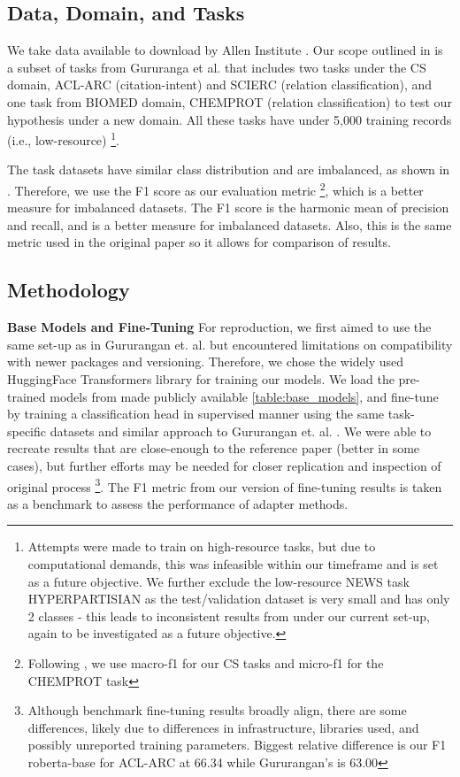 \documentclass[10pt,twocolumn,letterpaper]{article}
\begin{document}
\subsection{Data, Domain, and Tasks} 
We take data available to download by Allen Institute \cite{allenai_dont_stop_pretraining}. Our scope outlined in  is a subset of tasks from Gururanga et al. \cite{gururangan2020dont} that includes two tasks under the CS domain, ACL-ARC (citation-intent) and SCIERC (relation classification), and one task from BIOMED domain, CHEMPROT (relation classification) to test our hypothesis under a new domain. All these tasks have under 5,000 training records (i.e., low-resource) \footnote{Attempts were made to train on high-resource tasks, but due to computational demands, this was infeasible within our timeframe and is set as a future objective. We further exclude the low-resource NEWS task HYPERPARTISIAN as the test/validation dataset is very small and has only 2 classes - this leads to inconsistent results from \cite{allenai_dont_stop_pretraining} under our current set-up, again to be investigated as a future objective.}.

The task datasets have similar class distribution and are imbalanced, as shown in . Therefore, we use the F1 score as our evaluation metric \footnote{Following \cite{gururangan2020dont}, we use macro-f1 for our CS tasks and micro-f1 for the CHEMPROT task}, which is a better measure for imbalanced datasets. The F1 score is the harmonic mean of precision and recall, and is a better measure for imbalanced datasets. Also, this is the same metric used in the original paper \cite{gururangan2020dont} so it allows for comparison of results.

\subsection{Methodology} 

\textbf{Base Models and Fine-Tuning} For reproduction, we first aimed to use the same set-up as in Gururangan et. al. \cite{allenai_dont_stop_pretraining} but encountered limitations on compatibility with newer packages and versioning. Therefore, we chose the widely used HuggingFace Transformers library \cite{transformers} for training our models. We load the pre-trained models from \cite{allenai_dont_stop_pretraining} made publicly available \ref{table:base_models}, and fine-tune by training a classification head in supervised manner using the same task-specific datasets and similar approach to Gururangan et. al. \cite{gururangan2020dont}. We were able to recreate results that are close-enough to the reference paper (better in some cases), but further efforts may be needed for closer replication and inspection of original process \footnote{Although benchmark fine-tuning results broadly align, there are some differences, likely due to differences in infrastructure, libraries used, and possibly unreported training parameters. Biggest relative difference is our F1 roberta-base for ACL-ARC at 66.34 while Gururangan’s is 63.00}. The F1 metric from our version of fine-tuning results is taken as a benchmark to assess the performance of adapter methods.
\end{document}
